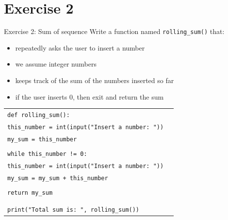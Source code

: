 \documentclass[t,handout,9pt]{beamer}
\begin{document}
\section{Exercise 2}
\begin{frame}{Exercise 2: Sum of sequence}
\vfill
Write a function named \texttt{rolling\_sum()} that:
\begin{itemize}
	\item repeatedly asks the user to insert a number
	\item we assume integer numbers
	\item keeps track of the sum of the numbers inserted so far
	\item if the user inserts $0$, then exit and return the sum
\end{itemize}
\vfill
\end{frame}
% 
\begin{frame}
	\vfill
		\begin{table}[]
		  \begin{flushleft}
		  \begin{tabular}{ll}
		  \texttt{def rolling\_sum():} &  \\
		  \texttt{\quad this\_number = int(input("Insert a number: "))}        & \\
		  \texttt{\quad my\_sum = this\_number}        & \\
		  \texttt{} &  \\
		  \texttt{\quad while this\_number != 0:}        & \\
		  \texttt{\quad\quad this\_number = int(input("Insert a number: "))}        & \\
		  \texttt{\quad\quad my\_sum = my\_sum + this\_number} &  \\
		  \texttt{} &  \\
		  \texttt{\quad return my\_sum} &  \\
		  \texttt{} &  \\
		  \texttt{} &  \\
		  \texttt{print("Total sum is: ", rolling\_sum())} &  \\
		  \end{tabular}
		  \end{flushleft}
		\end{table}
	\vfill
\end{frame}
\end{document}
